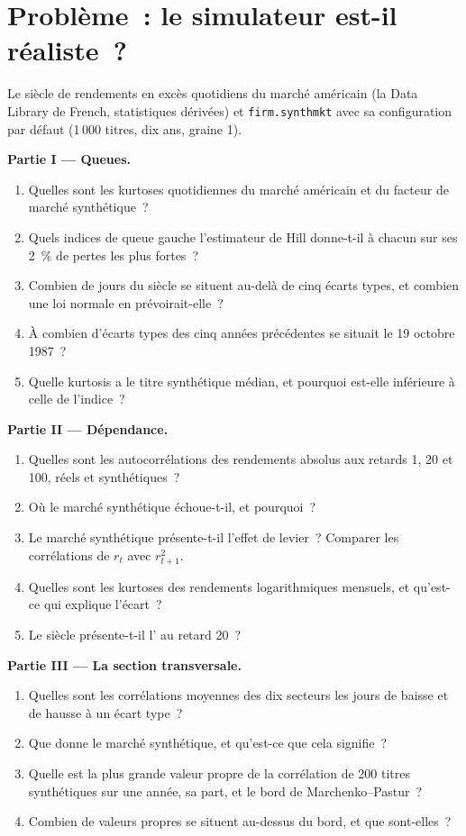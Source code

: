 \section{Problème~: le simulateur est-il réaliste~?}

\begin{problem}\label{pb:rs:stylised-facts-of-returns:1}
Le siècle de rendements en excès quotidiens du marché américain (la Data Library de French, statistiques dérivées) et \texttt{firm.synthmkt} avec sa
configuration par défaut (1\,000 titres, dix ans, graine 1).

\medskip\noindent\textbf{Partie I --- Queues.}
\begin{enumerate}
\item Quelles sont les kurtoses quotidiennes du marché américain et du facteur de marché synthétique~?
\item Quels indices de queue gauche l'estimateur de Hill donne-t-il à chacun sur ses 2~\% de pertes les plus fortes~?
\item Combien de jours du siècle se situent au-delà de cinq écarts types, et combien une loi normale en prévoirait-elle~?
\item À combien d'écarts types des cinq années précédentes se situait le 19 octobre 1987~?
\item Quelle kurtosis a le titre synthétique médian, et pourquoi est-elle inférieure à celle de l'indice~?
\end{enumerate}

\medskip\noindent\textbf{Partie II --- Dépendance.}
\begin{enumerate}[resume]
\item Quelles sont les autocorrélations des rendements absolus aux retards 1, 20 et 100, réels et synthétiques~?
\item Où le marché synthétique échoue-t-il, et pourquoi~?
\item Le marché synthétique présente-t-il l'effet de levier~? Comparer les corrélations de $r_t$ avec $r^2_{t+1}$.
\item Quelles sont les kurtoses des rendements logarithmiques mensuels, et qu'est-ce qui explique l'écart~?
\item Le siècle présente-t-il l' au retard 20~?
\end{enumerate}

\medskip\noindent\textbf{Partie III --- La section transversale.}
\begin{enumerate}[resume]
\item Quelles sont les corrélations moyennes des dix secteurs les jours de baisse et de hausse à un écart type~?
\item Que donne le marché synthétique, et qu'est-ce que cela signifie~?
\item Quelle est la plus grande valeur propre de la corrélation de 200 titres synthétiques sur une année, sa part, et le bord de Marchenko--Pastur~?
\item Combien de valeurs propres se situent au-dessus du bord, et que sont-elles~?
\end{enumerate}


\end{problem}
